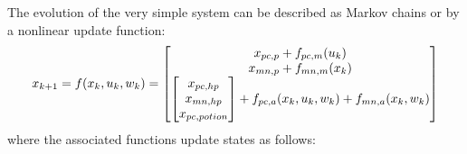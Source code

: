 \documentclass[9pt, onecolumn]{report}
\begin{document}
The evolution of the very simple system can be described as Markov chains or by a nonlinear update function:\[
    x_{k+1} = f(x_k, u_k, w_k) 
    = \mqty[
        x_{pc,p} + f_{pc,m}(u_k)\\
        x_{mn,p} + f_{mn,m}(x_k)\\
        \mqty[x_{pc,hp}\\ x_{mn,hp} \\ x_{pc,potion}] + f_{pc,a}(x_k,u_k,w_k) + f_{mn,a}(x_k,w_k)
    ]
\] where the associated functions update states as follows: 
\end{document}
